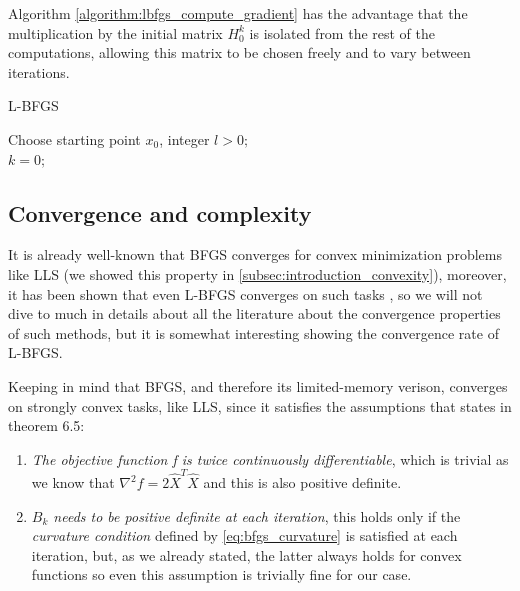 \noindent Algorithm \ref{algorithm:lbfgs_compute_gradient} has the advantage that the multiplication by the initial matrix $H_0^k$ is isolated from the rest of the computations, allowing this matrix to be chosen freely and to vary between iterations.

\begin{algorithm}[H]
    \caption{L-BFGS}
    \label{algorithm:lbfgs}
    Choose starting point $x_0$, integer $l > 0;$ \\
    $k = 0;$ \\
\end{algorithm}

\subsection{Convergence and complexity}
It is already well-known that BFGS converges for convex minimization problems like LLS (we showed this property in \ref{subsec:introduction_convexity}), moreover, it has been shown that even L-BFGS converges on such tasks \cite{liu1989limited}, so we will not dive to much in details about all the literature about the convergence properties of such methods, but it is somewhat interesting showing the convergence rate of L-BFGS.
\vspace{3mm}

\noindent Keeping in mind that BFGS, and therefore its limited-memory verison, converges on strongly convex tasks, like LLS, since it satisfies the assumptions that \cite{nocedal1999numerical} states in theorem 6.5:
\begin{enumerate}
    \item \textit{The objective function f is twice continuously differentiable}, which is trivial as we know that $\nabla^2f=2\hat{X}^T\hat{X}$ and this is also positive definite.
    \item \textit{$B_k$ needs to be positive definite at each iteration}, this holds only if the \textit{curvature condition} defined by \eqref{eq:bfgs_curvature} is satisfied at each iteration, but, as we already stated, the latter always holds for convex functions so even this assumption is trivially fine for our case.
\end{enumerate}

